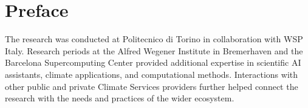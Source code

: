 \chapter*{Preface}


The research was conducted at Politecnico di Torino in collaboration with WSP Italy. Research periods at the Alfred Wegener Institute in Bremerhaven and the Barcelona Supercomputing Center provided additional expertise in scientific AI assistants, climate applications, and computational methods. Interactions with other public and private Climate Services providers further helped connect the research with the needs and practices of the wider ecosystem.